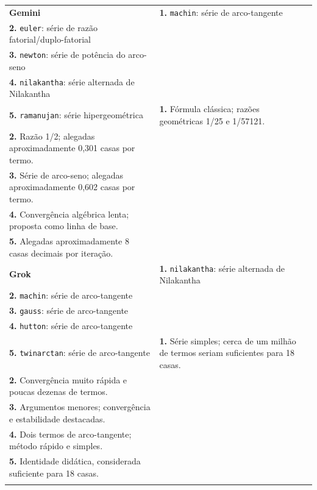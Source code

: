 \begin{longtable}{@{}p{1.45cm}p{5.15cm}p{8.15cm}@{}}
\addlinespace[4pt]
\textbf{Gemini} & \textbf{1.} \texttt{machin}: série de arco-tangente\\[-1pt]\textbf{2.} \texttt{euler}: série de razão fatorial/duplo-fatorial\\[-1pt]\textbf{3.} \texttt{newton}: série de potência do arco-seno\\[-1pt]\textbf{4.} \texttt{nilakantha}: série alternada de Nilakantha\\[-1pt]\textbf{5.} \texttt{ramanujan}: série hipergeométrica & \textbf{1.} Fórmula clássica; razões geométricas 1/25 e 1/57121.\\[-1pt]\textbf{2.} Razão 1/2; alegadas aproximadamente 0,301 casas por termo.\\[-1pt]\textbf{3.} Série de arco-seno; alegadas aproximadamente 0,602 casas por termo.\\[-1pt]\textbf{4.} Convergência algébrica lenta; proposta como linha de base.\\[-1pt]\textbf{5.} Alegadas aproximadamente 8 casas decimais por iteração.\\
\addlinespace[4pt]
\textbf{Grok} & \textbf{1.} \texttt{nilakantha}: série alternada de Nilakantha\\[-1pt]\textbf{2.} \texttt{machin}: série de arco-tangente\\[-1pt]\textbf{3.} \texttt{gauss}: série de arco-tangente\\[-1pt]\textbf{4.} \texttt{hutton}: série de arco-tangente\\[-1pt]\textbf{5.} \texttt{twinarctan}: série de arco-tangente & \textbf{1.} Série simples; cerca de um milhão de termos seriam suficientes para 18 casas.\\[-1pt]\textbf{2.} Convergência muito rápida e poucas dezenas de termos.\\[-1pt]\textbf{3.} Argumentos menores; convergência e estabilidade destacadas.\\[-1pt]\textbf{4.} Dois termos de arco-tangente; método rápido e simples.\\[-1pt]\textbf{5.} Identidade didática, considerada suficiente para 18 casas.\\
\addlinespace[4pt]
\bottomrule
\end{longtable}
\endgroup
